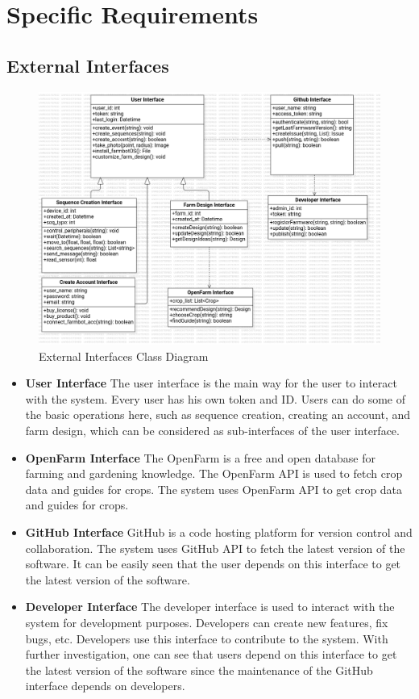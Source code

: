 \chapter{Specific Requirements} \label{specificRequirements}

\section{External Interfaces}

\begin{figure}[H]
    \centering
    \includegraphics[width=1\textwidth]{UML Diagrams/ClassDiagram.png}
    \caption{External Interfaces Class Diagram}
    \label{fig:ExternalInterfacesClassDiagram}
\end{figure}

\begin{itemize}
  \item \textbf{User Interface}
        The user interface is the main way for the user to interact with the system. Every user has his own token and ID. Users can do some of the basic operations here, such as sequence creation, creating an account, and farm design, which can be considered as sub-interfaces of the user interface.
  \item \textbf{OpenFarm Interface}
        The OpenFarm is a free and open database for farming and gardening knowledge. The OpenFarm API is used to fetch crop data and guides for crops. The system uses OpenFarm API to get crop data and guides for crops.
  \item \textbf{GitHub Interface}
        GitHub is a code hosting platform for version control and collaboration. The system uses GitHub API to fetch the latest version of the software. It can be easily seen that the user depends on this interface to get the latest version of the software.
  \item \textbf{Developer Interface}
        The developer interface is used to interact with the system for development purposes. Developers can create new features, fix bugs, etc. Developers use this interface to contribute to the system. With further investigation, one can see that users depend on this interface to get the latest version of the software since the maintenance of the GitHub interface depends on developers.
\end{itemize}


